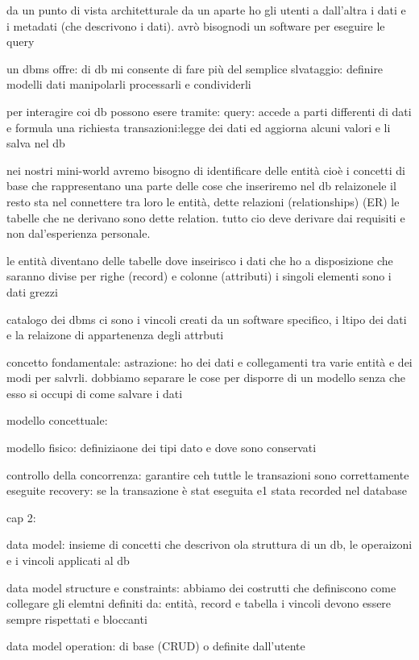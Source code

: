 da un punto di vista architetturale da un aparte ho gli utenti a dall'altra i dati e i metadati (che descrivono i dati). avrò bisognodi un software per eseguire le query 

un dbms offre:
di db mi consente di fare più del semplice slvataggio:
definire modelli dati
manipolarli
processarli e condividerli

per interagire coi db possono esere tramite:
query: accede a parti differenti di dati e formula una richiesta
transazioni:legge dei dati ed aggiorna alcuni valori e li salva nel db


nei nostri mini-world avremo bisogno di identificare delle entità cioè i concetti di base che rappresentano una parte delle cose che inseriremo nel db relaizonele il resto sta nel connettere tra loro le entità, dette relazioni (relationships) (ER) le tabelle che ne derivano sono dette relation. tutto cio deve derivare dai requisiti e non dal'esperienza personale.

le entità diventano delle tabelle dove inseirisco i dati che ho a disposizione che saranno divise per righe (record) e colonne (attributi) i singoli elementi sono i dati grezzi

catalogo dei dbms ci sono i vincoli creati da un software specifico, i ltipo dei dati e la relaizone di appartenenza degli attrbuti

concetto fondamentale: astrazione:
ho dei dati e collegamenti tra varie entità e dei modi per salvrli. dobbiamo separare le cose per disporre di un modello senza che esso si occupi di come salvare i dati

modello concettuale:

modello fisico: definiziaone dei tipi dato e dove sono conservati

controllo della concorrenza: garantire ceh tuttle le transazioni sono correttamente eseguite
recovery: se la transazione è stat eseguita e1 stata recorded nel database




cap 2: 


data model: insieme di concetti che descrivon ola struttura di un db, le operaizoni e i vincoli applicati al db

data model structure e constraints: abbiamo dei costrutti che definiscono come collegare gli elemtni definiti da: entità, record e tabella
i vincoli devono essere sempre rispettati e bloccanti

data model operation: di base (CRUD) o definite dall'utente

